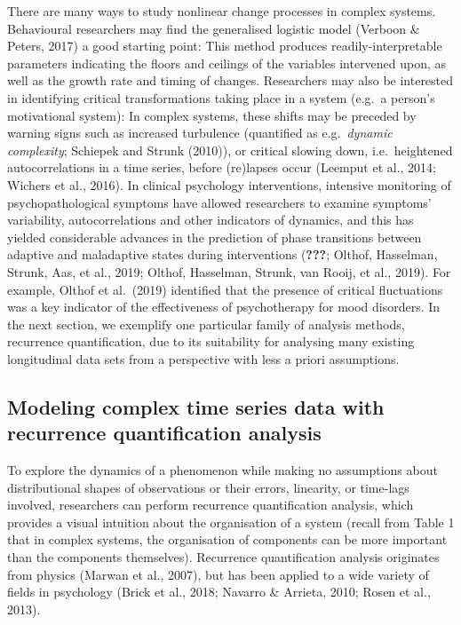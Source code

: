 \documentclass[
  british,
  man,floatsintext]{apa6}
\begin{document}
There are many ways to study nonlinear change processes in complex systems. Behavioural researchers may find the generalised logistic model (Verboon \& Peters, 2017) a good starting point: This method produces readily-interpretable parameters indicating the floors and ceilings of the variables intervened upon, as well as the growth rate and timing of changes. Researchers may also be interested in identifying critical transformations taking place in a system (e.g.~a person's motivational system): In complex systems, these shifts may be preceded by warning signs such as increased turbulence (quantified as e.g.~\emph{dynamic complexity}; Schiepek and Strunk (2010)), or critical slowing down, i.e.~heightened autocorrelations in a time series, before (re)lapses occur (Leemput et al., 2014; Wichers et al., 2016). In clinical psychology interventions, intensive monitoring of psychopathological symptoms have allowed researchers to examine symptoms' variability, autocorrelations and other indicators of dynamics, and this has yielded considerable advances in the prediction of phase transitions between adaptive and maladaptive states during interventions ({\textbf{???}}; Olthof, Hasselman, Strunk, Aas, et al., 2019; Olthof, Hasselman, Strunk, van Rooij, et al., 2019). For example, Olthof et al.~(2019) identified that the presence of critical fluctuations was a key indicator of the effectiveness of psychotherapy for mood disorders. In the next section, we exemplify one particular family of analysis methods, recurrence quantification, due to its suitability for analysing many existing longitudinal data sets from a perspective with less a priori assumptions.

\hypertarget{modeling-complex-time-series-data-with-recurrence-quantification-analysis}{%
\subsection{Modeling complex time series data with recurrence quantification analysis}\label{modeling-complex-time-series-data-with-recurrence-quantification-analysis}}

To explore the dynamics of a phenomenon while making no assumptions about distributional shapes of observations or their errors, linearity, or time-lags involved, researchers can perform recurrence quantification analysis, which provides a visual intuition about the organisation of a system (recall from Table 1 that in complex systems, the organisation of components can be more important than the components themselves). Recurrence quantification analysis originates from physics (Marwan et al., 2007), but has been applied to a wide variety of fields in psychology (Brick et al., 2018; Navarro \& Arrieta, 2010; Rosen et al., 2013).
\end{document}
